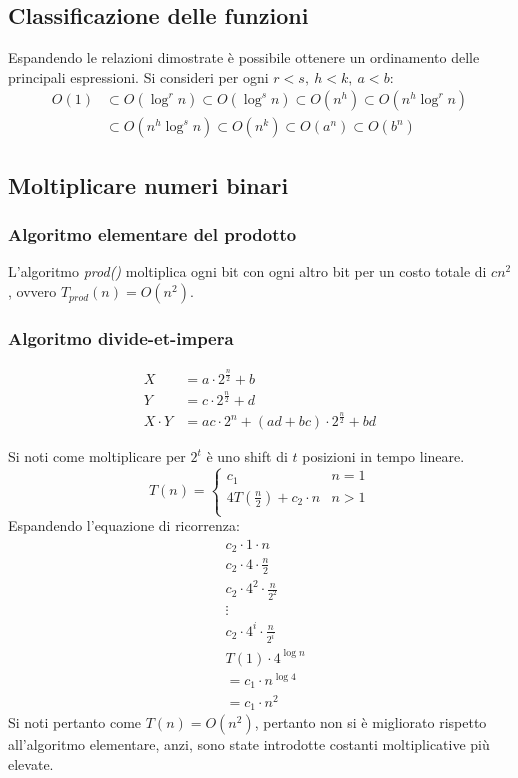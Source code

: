 \subsection{Classificazione delle funzioni}
Espandendo le relazioni dimostrate \`e possibile ottenere un ordinamento delle principali espressioni. Si consideri per ogni $r<s,\ h<k,\ a<b$:
\begin{align*}
O(1)&\subset O(\log^r n)\subset O(\log^s n)\subset O(n^h)\subset O(n^h\log^r n)\\
&\subset O(n^h\log^s n)\subset O(n^k)\subset O(a^n)\subset O(b^n)
\end{align*}
\subsection{Moltiplicare numeri binari}
\subsubsection{Algoritmo elementare del prodotto}
L'algoritmo \emph{prod()} moltiplica ogni bit con ogni altro bit per un costo totale di $cn^2$, ovvero $T_{prod}(n)=O(n^2)$.
\subsubsection{Algoritmo divide-et-impera}
\begin{align*}
	X &= a\cdot 2^{\frac{n}{2}}+ b\\
	Y &= c\cdot 2^{\frac{n}{2}}+ d\\
 X\cdot Y &= ac\cdot 2^n + (ad+bc)\cdot 2^{\frac{n}{2}} +bd
\end{align*}

Si noti come moltiplicare per $2^t$ \`e uno shift di $t$ posizioni in tempo lineare. 
$$T(n) = \begin{cases}
	c_1 & n = 1\\
	4T(\frac{n}{2}) + c_2\cdot n &n>1\\
\end{cases}$$
Espandendo l'equazione di ricorrenza: 
\begin{align*}
	&c_2\cdot1\cdot n\\
	&c_2\cdot 4\cdot \frac{n}{2}\\
	&c_2\cdot 4^2\cdot\frac{n}{2^2}\\
	&\vdots\\
	&c_2\cdot 4^i\cdot\frac{n}{2^i}\\
	&T(1)\cdot4^{\log n}\\
	&=c_1\cdot n^{\log 4}\\
	&=c_1\cdot n^2
\end{align*}
Si noti pertanto come $T(n) = O(n^2)$, pertanto non si \`e migliorato rispetto all'algoritmo elementare, anzi, sono state introdotte costanti moltiplicative pi\`u elevate. 
